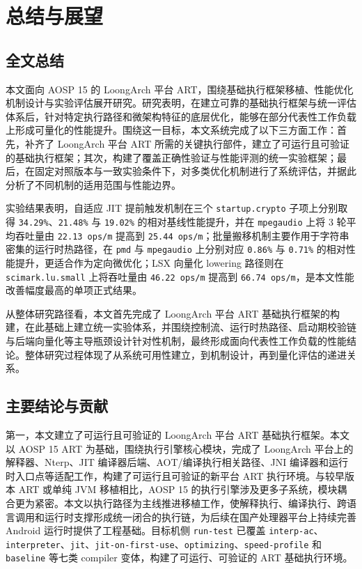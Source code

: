 \chapter{总结与展望}\label{chap:conclusion}

\section{全文总结}

本文面向 AOSP 15 的 LoongArch 平台 ART，围绕基础执行框架移植、性能优化机制设计与实验评估展开研究。研究表明，在建立可靠的基础执行框架与统一评估体系后，针对特定执行路径和微架构特征的底层优化，能够在部分代表性工作负载上形成可量化的性能提升。围绕这一目标，本文系统完成了以下三方面工作：首先，补齐了 LoongArch 平台 ART 所需的关键执行部件，建立了可运行且可验证的基础执行框架；其次，构建了覆盖正确性验证与性能评测的统一实验框架；最后，在固定对照版本与一致实验条件下，对多类优化机制进行了系统评估，并据此分析了不同机制的适用范围与性能边界。

实验结果表明，自适应 JIT 提前触发机制在三个 \texttt{startup.crypto} 子项上分别取得 \texttt{34.29\%}、\texttt{21.48\%} 与 \texttt{19.02\%} 的相对基线性能提升，并在 \texttt{mpegaudio} 上将 3 轮平均吞吐量由 \texttt{22.13\,ops/m} 提高到 \texttt{25.44\,ops/m}；批量搬移机制主要作用于字符串密集的运行时热路径，在 \texttt{pmd} 与 \texttt{mpegaudio} 上分别对应 \texttt{0.86\%} 与 \texttt{0.71\%} 的相对性能提升，更适合作为定向微优化；LSX 向量化 lowering 路径则在 \texttt{scimark.lu.small} 上将吞吐量由 \texttt{46.22\,ops/m} 提高到 \texttt{66.74\,ops/m}，是本文性能改善幅度最高的单项正式结果。

从整体研究路径看，本文首先完成了 LoongArch 平台 ART 基础执行框架的构建，在此基础上建立统一实验体系，并围绕控制流、运行时热路径、启动期校验链与后端向量化等主导瓶颈设计针对性机制，最终形成面向代表性工作负载的性能结论。整体研究过程体现了从系统可用性建立，到机制设计，再到量化评估的递进关系。

\section{主要结论与贡献}

第一，本文建立了可运行且可验证的 LoongArch 平台 ART 基础执行框架。本文以 AOSP 15 ART 为基础，围绕执行引擎核心模块，完成了 LoongArch 平台上的解释器、Nterp、JIT 编译器后端、AOT/编译执行相关路径、JNI 编译器和运行时入口点等适配工作，构建了可运行且可验证的新平台 ART 执行环境。与较早版本 ART 或单纯 JVM 移植相比，AOSP 15 的执行引擎涉及更多子系统，模块耦合更为紧密。本文以执行路径为主线推进移植工作，使解释执行、编译执行、跨语言调用和运行时支撑形成统一闭合的执行链，为后续在国产处理器平台上持续完善 Android 运行时提供了工程基础。目标机侧 \texttt{run-test} 已覆盖 \texttt{interp-ac}、\texttt{interpreter}、\texttt{jit}、\texttt{jit-on-first-use}、\texttt{optimizing}、\texttt{speed-profile} 和 \texttt{baseline} 等七类 compiler 变体，构建了可运行、可验证的 ART 基础执行环境。

